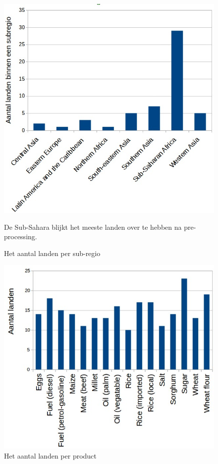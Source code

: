 \documentclass{article}
\begin{document}

\begin{figure}[ht!]
\centering
\includegraphics[scale=0.38]{EDA_1}
\caption{Het aantal landen per sub-regio }
\label{fig_sub-regio}
\medskip
\small
De Sub-Sahara blijkt het meeste landen over te hebben na pre-processing.  
\end{figure}

\begin{figure}[h!]
\centering
\includegraphics[scale=0.4]{EDA_2}
\caption{Het aantal landen per product}
\label{fig_land_prod}
\medskip
\small
\end{figure}
\end{document}
